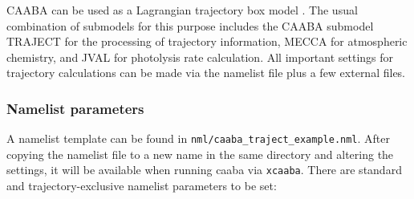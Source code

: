 \documentclass[twoside]{article}
\begin{document}
CAABA can be used as a Lagrangian trajectory box model \citep{2403}. The
usual combination of submodels for this purpose includes the CAABA
submodel TRAJECT for the processing of trajectory information, MECCA for
atmospheric chemistry, and JVAL for photolysis rate calculation. All
important settings for trajectory calculations can be made via the
namelist file plus a few external files.

\subsubsection{Namelist parameters}

A namelist template can be found in
\verb|nml/caaba_traject_example.nml|. After copying the namelist file to
a new name in the same directory and altering the settings, it will be
available when running caaba via \verb|xcaaba|. There are standard and
trajectory-exclusive namelist parameters to be set:
\end{document}
